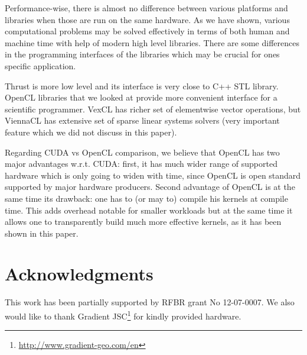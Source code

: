 \documentclass[1p]{elsarticle}
\begin{document}
Performance-wise, there is almost no difference between various platforms and
libraries when those are run on the same hardware. As we have shown, various
computational problems may be solved effectively in terms of both human and
machine time with help of modern high level libraries.  There are some
differences in the programming interfaces of the libraries which may be crucial
for ones specific application. 

Thrust is more low level and its interface is very close to C++ STL library.
OpenCL libraries that we looked at provide more convenient interface for a
scientific programmer. VexCL has richer set of elementwise vector operations,
but ViennaCL has extensive set of sparse linear systems solvers (very important
feature which we did not discuss in this paper).

Regarding CUDA vs OpenCL comparison, we believe that OpenCL has two major
advantages w.r.t. CUDA: first, it has much wider range of supported hardware
which is only going to widen with time, since OpenCL is open standard supported
by major hardware producers. Second advantage of OpenCL is at the same time its
drawback: one has to (or may to) compile his kernels at compile time. This adds
overhead notable for smaller workloads but at the same time it allows one to
transparently build much more effective kernels, as it has been shown in this
paper. 

\section{Acknowledgments}

This work has been partially supported by RFBR grant No 12-07-0007. We also
would like to thank Gradient
JSC\footnote{\href{http://www.gradient-geo.com/en}{http://www.gradient-geo.com/en}}
for kindly provided hardware.

\nocite{*}


\end{document}
